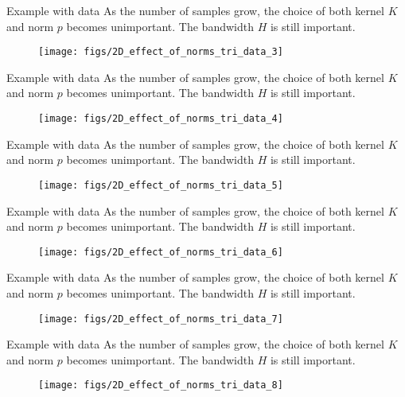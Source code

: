 \documentclass[11pt, aspectratio=149]{beamer}
\theoremstyle{plain}
\begin{document}
\begin{frame}[fragile, t]{Example with data}
	As the number of samples grow, the choice of both kernel $K$ and norm $p$ becomes unimportant. The bandwidth $H$ is still important.
	\vfill
	\begin{figure}
		\centering
		\texttt{[image: figs/2D\_effect\_of\_norms\_tri\_data\_3]}
	\end{figure}
\end{frame}


\begin{frame}[fragile, t]{Example with data}
	As the number of samples grow, the choice of both kernel $K$ and norm $p$ becomes unimportant. The bandwidth $H$ is still important.
	\vfill
	\begin{figure}
		\centering
		\texttt{[image: figs/2D\_effect\_of\_norms\_tri\_data\_4]}
	\end{figure}
\end{frame}


\begin{frame}[fragile, t]{Example with data}
	As the number of samples grow, the choice of both kernel $K$ and norm $p$ becomes unimportant. The bandwidth $H$ is still important.
	\vfill
	\begin{figure}
		\centering
		\texttt{[image: figs/2D\_effect\_of\_norms\_tri\_data\_5]}
	\end{figure}
\end{frame}


\begin{frame}[fragile, t]{Example with data}
	As the number of samples grow, the choice of both kernel $K$ and norm $p$ becomes unimportant. The bandwidth $H$ is still important.
	\vfill
	\begin{figure}
		\centering
		\texttt{[image: figs/2D\_effect\_of\_norms\_tri\_data\_6]}
	\end{figure}
\end{frame}


\begin{frame}[fragile, t]{Example with data}
	As the number of samples grow, the choice of both kernel $K$ and norm $p$ becomes unimportant. The bandwidth $H$ is still important.
	\vfill
	\begin{figure}
		\centering
		\texttt{[image: figs/2D\_effect\_of\_norms\_tri\_data\_7]}
	\end{figure}
\end{frame}


\begin{frame}[fragile, t]{Example with data}
	As the number of samples grow, the choice of both kernel $K$ and norm $p$ becomes unimportant. The bandwidth $H$ is still important.
	\vfill
	\begin{figure}
		\centering
		\texttt{[image: figs/2D\_effect\_of\_norms\_tri\_data\_8]}
	\end{figure}
\end{frame}
\end{document}

